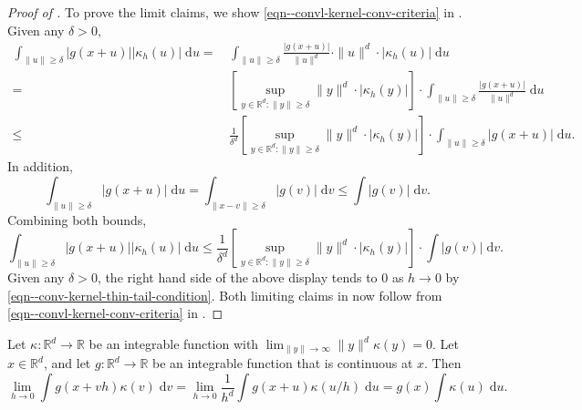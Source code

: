 \begin{proof}[Proof of ]
To prove the limit claims, we show \eqref{eqn--convl-kernel-conv-criteria} in
.
Given any \(\delta > 0\),
\begin{align*}
  \int_{\|u\| \geq \delta} |g (x + u)| \left| \kappa_{h} (u) \right| \;
  \mathrm{d} u =
  & \, \int_{\|u\| \geq \delta} \frac{|g (x + u)|}{\|u\|^{d}} \cdot \|u\|^{d}
  \cdot \left| \kappa_{h} (u) \right| \; \mathrm{d} u \\
  =
  & \, \left[ \sup_{y \in \mathbb{R}^{d} : \|y\| \geq \delta} \|y\|^{d} \cdot
  \left| \kappa_{h} (y) \right| \right] \cdot \int_{\|u\| \geq \delta} \frac{|g
  (x + u)|}{\|u\|^{d}} \; \mathrm{d} u \\
  \leq
  & \, \frac{1}{\delta^{d}} \left[ \sup_{y \in \mathbb{R}^{d} : \|y\| \geq
  \delta} \|y\|^{d} \cdot \left| \kappa_{h} (y) \right| \right] \cdot
  \int_{\|u\| \geq \delta} |g (x + u)| \; \mathrm{d} u.
\end{align*}
In addition,
\begin{equation*}
  \int_{\|u\| \geq \delta} |g (x + u)| \; \mathrm{d} u = \int_{\|x - v\| \geq
  \delta} |g (v)| \; \mathrm{d} v \leq \int |g (v)| \; \mathrm{d} v.
\end{equation*}
Combining both bounds,
\begin{equation*}
  \int_{\|u\| \geq \delta} |g (x + u)| \left| \kappa_{h} (u) \right| \;
  \mathrm{d} u \leq \frac{1}{\delta^{d}} \left[ \sup_{y \in \mathbb{R}^{d} :
  \|y\| \geq \delta} \|y\|^{d} \cdot \left| \kappa_{h} (y) \right| \right] \cdot
  \int |g (v)| \; \mathrm{d} v.
\end{equation*}
Given any \(\delta > 0\), the right hand side of the above display tends to 0 as
\(h \to 0\) by \eqref{eqn--conv-kernel-thin-tail-condition}.
Both limiting claims in  now follow from
\eqref{eqn--convl-kernel-conv-criteria} in
.
\end{proof}

\begin{theorem}
\label{thm--convl-kernel-eg-thin-tail}
Let \(\kappa : \mathbb{R}^{d} \to \mathbb{R}\) be an integrable function with
\(\lim_{\|y\| \to \infty} \|y\|^{d} \kappa (y) = 0\).
Let \(x \in \mathbb{R}^{d}\), and let \(g : \mathbb{R}^{d} \to \mathbb{R}\) be
an integrable function that is continuous at \(x\).
Then
\begin{equation}
  \lim_{h \to 0} \int g (x + v h) \kappa (v) \; \mathrm{d} v = \lim_{h \to
  0} \frac{1}{h^{d}} \int g (x + u) \kappa (u / h) \; \mathrm{d} u =
  g (x) \int \kappa (u) \; \mathrm{d} u.
  \label{eqn--convl-kernel-eg-thin-tail}
\end{equation}
\end{theorem}

